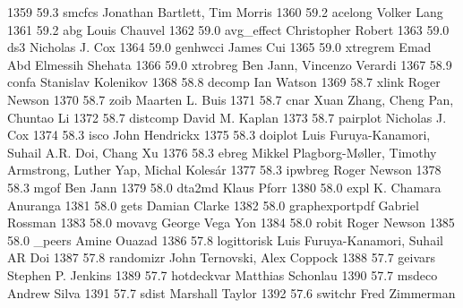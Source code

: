   1359     59.3    smcfcs        Jonathan Bartlett, Tim Morris           
  1360     59.2    acelong       Volker Lang                             
  1361     59.2    abg           Louis Chauvel                           
  1362     59.0    avg_effect    Christopher Robert                      
  1363     59.0    ds3           Nicholas J. Cox                         
  1364     59.0    genhwcci      James Cui                               
  1365     59.0    xtregrem      Emad Abd Elmessih Shehata               
  1366     59.0    xtrobreg      Ben Jann, Vincenzo Verardi              
  1367     58.9    confa         Stanislav Kolenikov                     
  1368     58.8    decomp        Ian Watson                              
  1369     58.7    xlink         Roger Newson                            
  1370     58.7    zoib          Maarten L. Buis                         
  1371     58.7    cnar          Xuan Zhang, Cheng Pan, Chuntao Li       
  1372     58.7    distcomp      David M. Kaplan                         
  1373     58.7    pairplot      Nicholas J. Cox                         
  1374     58.3    isco          John Hendrickx                          
  1375     58.3    doiplot       Luis Furuya-Kanamori, Suhail A.R. Doi,  
                                   Chang Xu                                
  1376     58.3    ebreg         Mikkel Plagborg-Møller, Timothy        
                                   Armstrong, Luther Yap, Michal Kolesár  
  1377     58.3    ipwbreg       Roger Newson                            
  1378     58.3    mgof          Ben Jann                                
  1379     58.0    dta2md        Klaus Pforr                             
  1380     58.0    expl          K. Chamara Anuranga                     
  1381     58.0    gets          Damian Clarke                           
  1382     58.0    graphexportpdf  Gabriel Rossman                         
  1383     58.0    movavg        George Vega Yon                         
  1384     58.0    robit         Roger Newson                            
  1385     58.0    _peers        Amine Ouazad                            
  1386     57.8    logittorisk   Luis Furuya-Kanamori, Suhail AR Doi     
  1387     57.8    randomizr     John Ternovski, Alex Coppock            
  1388     57.7    geivars       Stephen P. Jenkins                      
  1389     57.7    hotdeckvar    Matthias Schonlau                       
  1390     57.7    msdeco        Andrew Silva                            
  1391     57.7    sdist         Marshall Taylor                         
  1392     57.6    switchr       Fred Zimmerman                          
